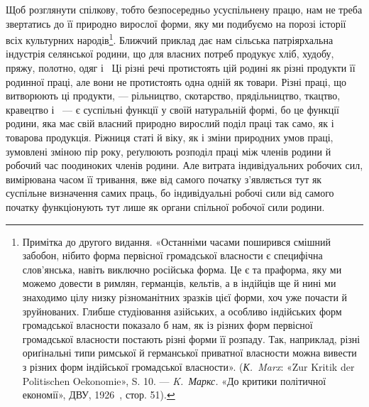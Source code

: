 Щоб розглянути спілкову, тобто безпосередньо усуспільнену
працю, нам не треба звертатись до її природно вирослої форми,
яку ми подибуємо на порозі історії всіх культурних народів\footnote{
Примітка до другого видання. «Останніми часами поширився
смішний забобон, нібито форма первісної громадської власности є специфічна
слов’янська, навіть виключно російська форма. Це є та праформа,
яку ми можемо довести в римлян, германців, кельтів, а в індійців ще й нині
ми знаходимо цілу низку різноманітних зразків цієї форми, хоч уже
почасти й зруйнованих. Глибше студіювання азійських, а особливо індійських
форм громадської власности показало б нам, як із різних форм
первісної громадської власности постають різні форми її розпаду. Так,
наприклад, різні ориґінальні типи римської й германської приватної
власности можна вивести з різних форм індійської громадської власности».
(\emph{К.~Marx}: «Zur Kritik der Politischen Oekonomie», S. 10. — \emph{K.~Маркс.}
«До критики політичної економії», ДВУ, 1926~, стор. 51).
}.
Ближчий приклад дає нам сільська патріярхальна індустрія селянської
родини, що для власних потреб продукує хліб, худобу,
пряжу, полотно, одяг і~ Ці різні речі протистоять цій родині
як різні продукти її родинної праці, але вони не протистоять
одна одній як товари. Різні праці, що витворюють ці продукти, —
рільництво, скотарство, прядільництво, ткацтво, кравецтво і~ —
є суспільні функції у своїй натуральній формі, бо це функції
родини, яка має свій власний природно вирослий поділ праці
так само, як і товарова продукція. Ріжниця статі й віку, як і
зміни природних умов праці, зумовлені зміною пір року, реґулюють
розподіл праці між членів родини й робочий час поодиноких
членів родини. Але витрата індивідуальних робочих сил,
вимірювана часом її тривання, вже від самого початку з’являється
тут як суспільне визначення самих праць, бо індивідуальні робочі
сили від самого початку функціонують тут лише як органи спільної
робочої сили родини.

